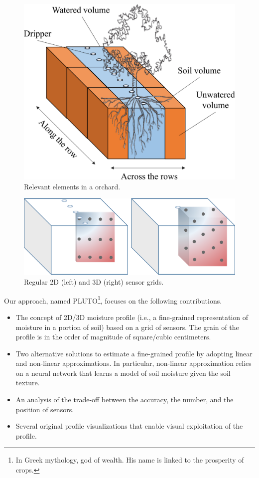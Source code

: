 \begin{figure}[t]
\centering
\includegraphics[scale=.14]{chapters/physics-aware/pluto/img/SoilVolume2.pdf}
\caption{Relevant elements in a orchard.}
\label{pluto-fig:soilvolume}    
\end{figure}

\begin{figure}[t]
\centering
\includegraphics[scale=.21]{chapters/physics-aware/pluto/img/SensorGrid2.pdf}
\caption{Regular 2D (left) and 3D (right) sensor grids.}
\label{pluto-fig:sensorgrid}
\end{figure}

Our approach, named PLUTO\footnote{In Greek mythology, god of wealth. His name is linked to the prosperity of crops.}, focuses on the following contributions.
\begin{itemize}
    \item The concept of 2D/3D moisture profile (i.e., a fine-grained representation of moisture in a portion of soil) based on a grid of sensors. 
    The grain of the profile is in the order of magnitude of square/cubic centimeters.
    \item Two alternative solutions to estimate a fine-grained profile by adopting linear and non-linear approximations.
    In particular, non-linear approximation relies on a neural network that learns a model of soil moisture given the soil texture.
    \item An analysis of the trade-off between the accuracy, the number, and the position of sensors.
    \item Several original profile visualizations that enable visual exploitation of the profile.
\end{itemize}

